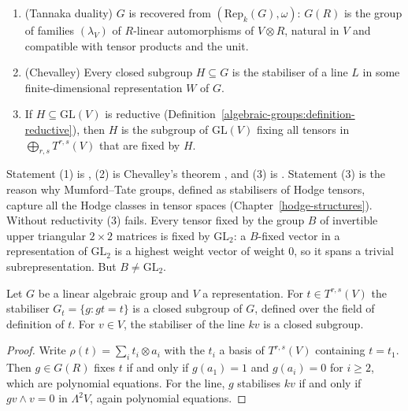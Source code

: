 \begin{theorem}\label{algebraic-groups:theorem-tannakian}
\begin{enumerate}
\item (Tannaka duality) $G$ is recovered from $(\mathrm{Rep}_k(G), \omega)$: $G(R)$ is the group of families $(\lambda_V)$ of $R$-linear automorphisms of $V \otimes R$,
natural in $V$ and compatible with tensor products and the unit.
\item (Chevalley) Every closed subgroup $H \subseteq G$ is the stabiliser of a line $L$ in some finite-dimensional representation $W$ of $G$.
\item If $H \subseteq \mathrm{GL}(V)$ is reductive (Definition~\ref{algebraic-groups:definition-reductive}), then $H$ is the subgroup of $\mathrm{GL}(V)$ fixing all tensors in
$\bigoplus_{r,s}T^{r,s}(V)$ that are fixed by $H$.
\end{enumerate}
\end{theorem}

Statement (1) is \cite[Theorem 2.11]{deligne-milne}, (2) is Chevalley's theorem \cite{milne-algebraic-groups}, and (3) is
\cite[Proposition 3.1(c)]{deligne-abelian}. Statement (3) is the reason why Mumford--Tate groups, defined as stabilisers of Hodge tensors, capture all the Hodge classes in
tensor spaces (Chapter~\ref{hodge-structures}). Without reductivity (3) fails. Every tensor fixed by the group $B$ of invertible upper triangular $2 \times 2$ matrices is fixed by
$\mathrm{GL}_2$: a $B$-fixed vector in a representation of $\mathrm{GL}_2$ is a highest weight vector of weight $0$, so it spans a trivial subrepresentation. But $B \neq \mathrm{GL}_2$.

\begin{proposition}\label{algebraic-groups:proposition-subgroup-fixing}
Let $G$ be a linear algebraic group and $V$ a representation. For $t \in T^{r,s}(V)$ the stabiliser $G_t = \{g : gt = t\}$ is a closed subgroup of $G$, defined over the
field of definition of $t$. For $v \in V$, the stabiliser of the line $kv$ is a closed subgroup.
\end{proposition}

\begin{proof}
Write $\rho(t) = \sum_it_i \otimes a_i$ with the $t_i$ a basis of $T^{r,s}(V)$ containing $t = t_1$. Then $g \in G(R)$ fixes $t$ if and only if $g(a_1) = 1$ and $g(a_i) = 0$ for $i \geq 2$,
which are polynomial equations. For the line, $g$ stabilises $kv$ if and only if $gv \wedge v = 0$ in $\Lambda^2V$, again polynomial equations.
\end{proof}

